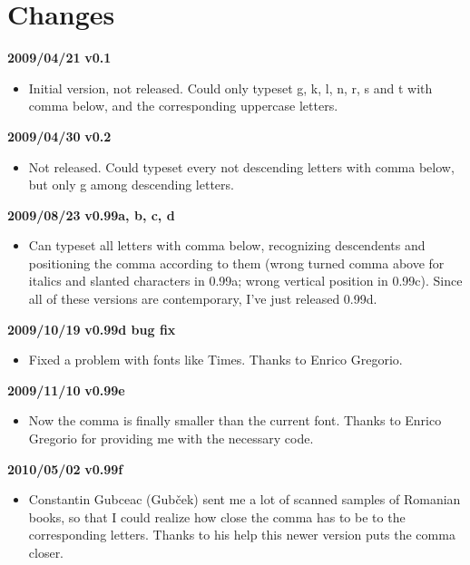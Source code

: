 \documentclass{ltxdoc}
\begin{document}



\appendix
\section{Changes}
\textbf{2009/04/21} \textbf{v0.1} 

\vspace{.5em}
\noindent
\begin{itemize}
\item Initial version, not released. Could only typeset g, k, l, n, r, s 
and t with comma below, and the corresponding uppercase letters.
\end{itemize}

\vspace{.5em}
\noindent
\textbf{2009/04/30} \textbf{v0.2}

\vspace{.5em}
\noindent
\begin{itemize}
\item Not released. Could typeset every not descending letters with comma 
below, but only g among descending letters.
\end{itemize}

\vspace{.5em}
\noindent
\textbf{2009/08/23} \textbf{v0.99a, b, c, d}

\vspace{.5em}
\noindent
\begin{itemize}
\item Can typeset all letters with comma below, recognizing descendents and
positioning the comma according to them (wrong turned comma above for italics 
and slanted characters in 0.99a; wrong vertical position in 0.99c). Since all 
of these versions are contemporary, I've just released 0.99d.
\end{itemize}

\vspace{.5em}
\noindent
\textbf{2009/10/19} \textbf{v0.99d bug fix}

\begin{itemize}
\item Fixed a problem with fonts like Times. Thanks to Enrico Gregorio.
\end{itemize}

\vspace{.5em}
\noindent
\textbf{2009/11/10} \textbf{v0.99e}

\begin{itemize}
\item Now the comma is finally smaller than the current font. Thanks to Enrico 
Gregorio for providing me with the necessary code.
\end{itemize}

\vspace{.5em}
\noindent
\textbf{2010/05/02} \textbf{v0.99f}

\begin{itemize}
\item Constantin Gubceac (Gub\v{c}ek) sent me a lot of scanned samples of
Romanian books, so that I could realize how close the comma has to be to the
corresponding letters. Thanks to his help this newer version puts the comma
closer.
\end{itemize}
\end{document}
